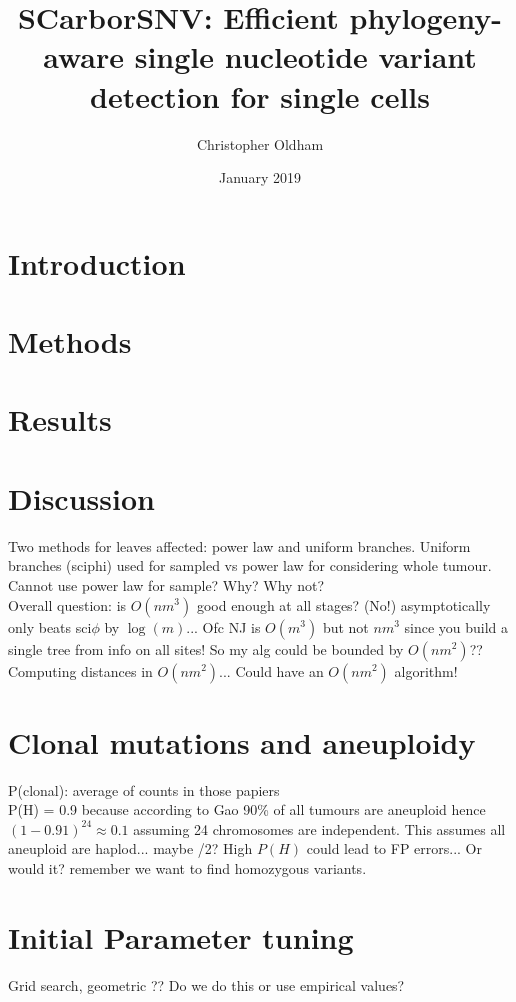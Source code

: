 \documentclass{article}
\title{SCarborSNV: Efficient phylogeny-aware single nucleotide variant detection for single cells}
\author{Christopher Oldham}
\date{January 2019}
\begin{document}
\maketitle


\section{Introduction}


\section{Methods}


\section{Results}
\section{Discussion}

Two methods for leaves affected: power law and uniform branches. Uniform branches (sciphi) used for sampled vs power law for considering whole tumour. Cannot use power law for sample? Why? Why not?\\
Overall question: is $O(nm^3)$ good enough at all stages? (No!) asymptotically only beats sci$\phi$ by $\log(m)$... Ofc NJ is $O(m^3)$ but not $nm^3$ since you build a single tree from info on all sites! So my alg could be bounded by $O(nm^2)$?? Computing distances in $O(nm^2)$... Could have an $O(nm^2)$ algorithm! 





\newpage
{}
%


\newpage
\appendix
\section{Clonal mutations and aneuploidy}
P(clonal): average of counts in those papiers\\
P(H) = 0.9 because according to Gao 90\% of all tumours are aneuploid hence $(1-0.91)^{24}\approx 0.1$ assuming 24 chromosomes are independent. This assumes all aneuploid are haplod... maybe /2? High $P(H)$ could lead to FP errors... Or would it? remember we want to find homozygous variants.
\section{Initial Parameter tuning}
Grid search, geometric ?? Do we do this or use empirical values?
\end{document}
